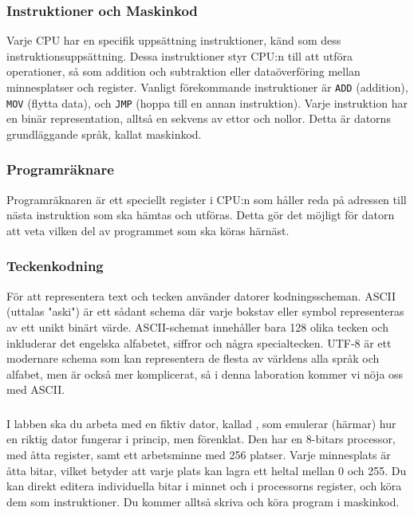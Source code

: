 \subsubsection{Instruktioner och Maskinkod}
Varje CPU har en specifik uppsättning instruktioner, känd som dess instruktionsuppsättning. Dessa instruktioner styr CPU:n till att utföra operationer, så som addition och subtraktion eller dataöverföring mellan minnesplatser och register. Vanligt förekommande instruktioner är \texttt{ADD} (addition), \texttt{MOV} (flytta data), och \texttt{JMP} (hoppa till en annan instruktion). Varje instruktion har en binär representation, alltså en sekvens av ettor och nollor. Detta är datorns grundläggande språk, kallat maskinkod.

\subsubsection{Programräknare}
Programräknaren är ett speciellt register i CPU:n som håller reda på adressen till nästa instruktion som ska hämtas och utföras. Detta gör det möjligt för datorn att veta vilken del av programmet som ska köras härnäst.

\subsubsection{Teckenkodning}
För att representera text och tecken använder datorer kodningsscheman. ASCII (uttalas "aski") är ett sådant schema där varje bokstav eller symbol representeras av ett unikt binärt värde. ASCII-schemat innehåller bara 128 olika tecken och inkluderar det engelska alfabetet, siffror och några specialtecken. UTF-8 är ett modernare schema som kan representera de flesta av världens alla språk och alfabet, men är också mer komplicerat, så i denna laboration kommer vi nöja oss med ASCII.

\subsubsection{\progname}
I labben ska du arbeta med en fiktiv dator, kallad \progname, som emulerar (härmar) hur en riktig dator fungerar i princip, men förenklat.
Den har en 8-bitars processor, med åtta register, samt ett arbetsminne med 256 platser. Varje minnesplats är åtta bitar, vilket betyder att varje plats kan lagra ett heltal mellan 0 och 255.
Du kan direkt editera individuella bitar i minnet och i processorns register, och köra dem som instruktioner. Du kommer alltså skriva och köra program i maskinkod.

